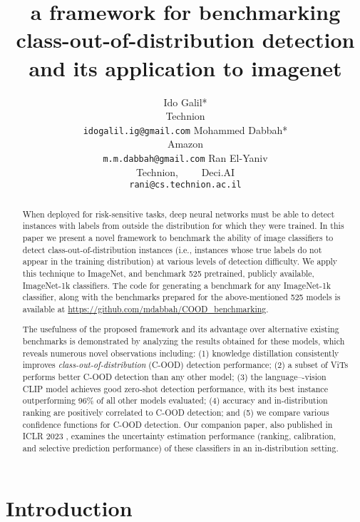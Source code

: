 \documentclass[table]{article} \usepackage{PRIMEarxiv}
\title{a framework for benchmarking class-out-of-distribution detection and its application to imagenet}
\author{
   Ido Galil*\\ 
Technion\\
  \texttt{\small {idogalil.ig@gmail.com}} 
   \And
    Mohammed Dabbah*\\ 
Amazon\\
  \texttt{\small {m.m.dabbah@gmail.com}} 
   \And
   Ran El-Yaniv \\
   Technion, \ \ \ \ Deci.AI\\
   \texttt{\small {rani@cs.technion.ac.il}}
   }
\begin{document}
\maketitle

\begin{abstract}
\let\thefootnote\relax{}
When deployed for risk-sensitive tasks, deep neural networks must be able to detect instances with labels from outside the distribution for which they were trained.
In this paper we present a novel framework to benchmark the ability of image classifiers to detect class-out-of-distribution instances
(i.e., instances whose true labels do not appear in the training distribution) at various levels of detection difficulty.
We apply this technique to ImageNet, and benchmark 525 pretrained, publicly available, ImageNet-1k classifiers. 
The code for generating a benchmark for any ImageNet-1k classifier, along with the benchmarks prepared for the above-mentioned 525 models is available at \url{https://github.com/mdabbah/COOD_benchmarking}.

The usefulness of the proposed framework and its advantage over alternative existing benchmarks is demonstrated by analyzing the results obtained for these models, which reveals numerous novel observations including:
(1) knowledge distillation consistently improves \emph{class-out-of-distribution} (C-OOD) detection performance; (2) a subset of ViTs performs better C-OOD detection than any other model; (3) the language–-vision CLIP model achieves good zero-shot detection performance, with its best instance outperforming 96\% of all other models evaluated; (4) accuracy and in-distribution ranking are positively correlated to C-OOD detection; and 
(5) we compare various confidence functions for C-OOD detection.
Our companion paper, also published in ICLR 2023 
 \citep{galil2023what}, examines the uncertainty estimation performance (ranking, calibration, and selective prediction performance) of these classifiers in an in-distribution setting.
\end{abstract}

\section{Introduction}
\end{document}
